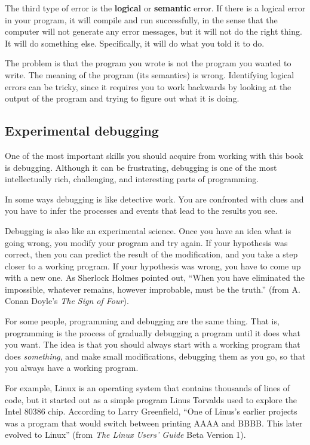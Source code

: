 The third type of error is the {\bf logical} or {\bf semantic}
error.  If there is a logical error in your program, it will
compile and run successfully, in the sense that the computer
will not generate any error messages, but it will not do the
right thing.  It will do something else.  Specifically, it will
do what you told it to do.

The problem is that the program you wrote is not the program
you wanted to write.  The meaning of the program (its semantics)
is wrong.  Identifying logical errors can be tricky, since
it requires you to work backwards by looking at the output
of the program and trying to figure out what it is doing.

\subsection{Experimental debugging}

One of the most important skills you should acquire from working with
this book is debugging.  Although it can be frustrating, debugging is
one of the most intellectually rich, challenging, and interesting
parts of programming.

In some ways debugging is like detective work.  You are
confronted with clues and you have to infer the processes
and events that lead to the results you see.

Debugging is also like an experimental science.  Once you have an idea
what is going wrong, you modify your program and try again.  If your
hypothesis was correct, then you can predict the result of the
modification, and you take a step closer to a working program.  If
your hypothesis was wrong, you have to come up with a new one.  As
Sherlock Holmes pointed out, ``When you have eliminated the
impossible, whatever remains, however improbable, must be the truth.''
(from A. Conan Doyle's {\em The Sign of Four}).


For some people, programming and debugging are the
same thing.  That is, programming is the process of gradually
debugging a program until it does what you want.  The idea
is that you should always start with a working program that
does {\em something}, and make small modifications, debugging
them as you go, so that you always have a working program.

For example, Linux is an operating system that contains thousands of
lines of code, but it started out as a simple program Linus Torvalds
used to explore the Intel 80386 chip.  According to Larry Greenfield,
``One of Linus's earlier projects was a program that would switch
between printing AAAA and BBBB.  This later evolved to Linux''
(from {\em The Linux Users' Guide} Beta Version 1).

